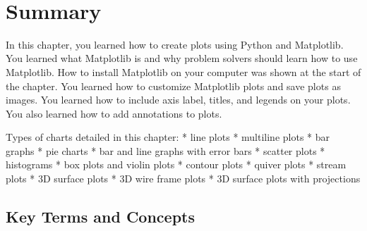 \documentclass{book}
\begin{document}
    \begin{center}
    \end{center}
    { \hspace*{\fill} \\}
    

    
        \newpage
        \section{Summary}\label{summary}

    




    
        In this chapter, you learned how to create plots using Python and
Matplotlib. You learned what Matplotlib is and why problem solvers
should learn how to use Matplotlib. How to install Matplotlib on your
computer was shown at the start of the chapter. You learned how to
customize Matplotlib plots and save plots as images. You learned how to
include axis label, titles, and legends on your plots. You also learned
how to add annotations to plots.

Types of charts detailed in this chapter: * line plots * multiline plots
* bar graphs * pie charts * bar and line graphs with error bars *
scatter plots * histograms * box plots and violin plots * contour plots
* quiver plots * stream plots * 3D surface plots * 3D wire frame plots *
3D surface plots with projections
    




    
        \subsection{Key Terms and Concepts}\label{key-terms-and-concepts}
    
\end{document}
